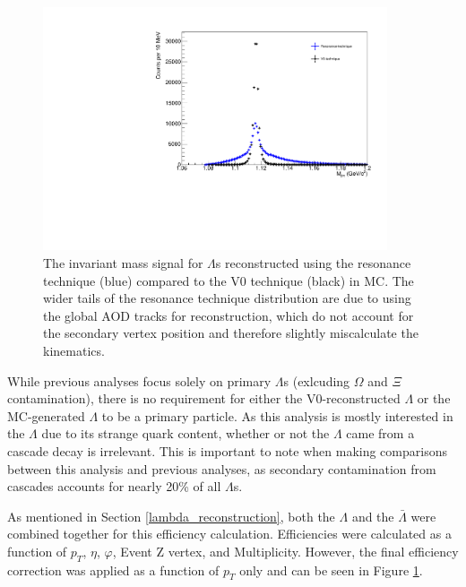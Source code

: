 \documentclass[ALICE,manyauthors]{ALICE_analysis_notes}
\begin{document}
\begin{itemize}
\begin{figure}[ht]
\centering
\includegraphics[width=4in]{figures/lambda_mass_resonance_mc.pdf}
\caption{The invariant mass signal for $\Lambda$s reconstructed using the resonance technique (blue) compared to the V0 technique (black) in MC. The wider tails of the resonance technique distribution are due to using the global AOD tracks for reconstruction, which do not account for the secondary vertex position and therefore slightly miscalculate the kinematics.}
\label{lambda_eff}
\end{figure}

While previous analyses focus solely on primary $\Lambda$s (exlcuding $\Omega$ and $\Xi$ contamination), there is no requirement for either the V0-reconstructed $\Lambda$ or the MC-generated $\Lambda$ to be a primary particle. As this analysis is mostly interested in the $\Lambda$ due to its strange quark content, whether or not the $\Lambda$ came from a cascade decay is irrelevant. This is important to note when making comparisons between this analysis and previous analyses, as secondary contamination from cascades accounts for nearly 20\% of all $\Lambda$s.

As mentioned in Section \ref{lambda_reconstruction}, both the $\Lambda$ and the $\bar{\Lambda}$ were combined together for this efficiency calculation. Efficiencies were calculated as a function of $p_T$, $\eta$, $\varphi$, Event Z vertex, and Multiplicity. However, the final efficiency correction was applied as a function of $p_T$ only and can be seen in Figure \ref{lambda_eff}.


\end{itemize}
\end{document}
